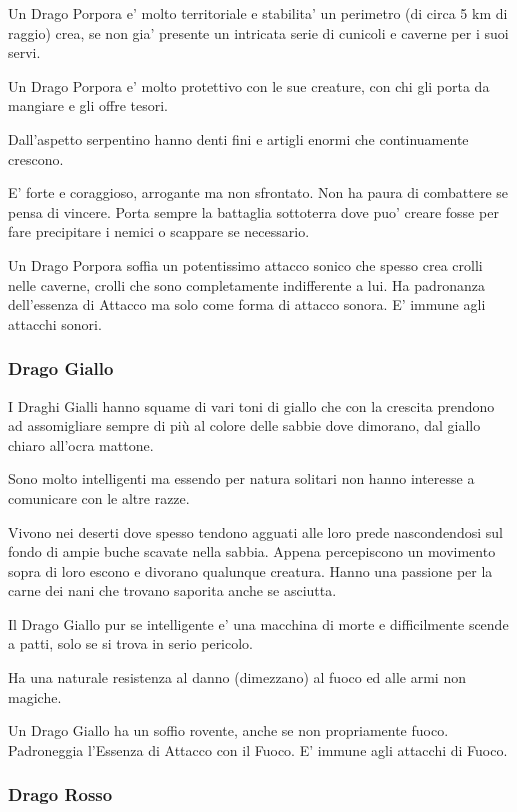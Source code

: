 \documentclass[a4paper,11pt,twoside,openany]{book}
\begin{document}
Un Drago Porpora e' molto territoriale e stabilita' un perimetro (di circa 5 km di raggio) crea, se non gia' presente un intricata serie di cunicoli e caverne per i suoi servi.

Un Drago Porpora e' molto protettivo con le sue creature, con chi gli porta da mangiare e gli offre tesori.

Dall'aspetto serpentino hanno denti fini e artigli enormi che continuamente crescono.

E' forte e coraggioso, arrogante ma non sfrontato. Non ha paura di combattere se pensa di vincere. Porta sempre la battaglia sottoterra dove puo' creare fosse per fare precipitare i nemici o scappare se necessario.

Un Drago Porpora soffia un potentissimo attacco sonico che spesso crea crolli nelle caverne, crolli che sono completamente indifferente a lui. Ha padronanza dell'essenza di Attacco ma solo come forma di attacco sonora. E' immune agli attacchi sonori.


\subsubsection{Drago Giallo}  

I Draghi Gialli hanno squame di vari toni di giallo che con la crescita prendono ad assomigliare sempre di più al colore delle sabbie dove dimorano, dal giallo chiaro all'ocra mattone.

Sono molto intelligenti ma essendo per natura solitari non hanno interesse a comunicare con le altre razze.

Vivono nei deserti dove spesso tendono agguati alle loro prede nascondendosi sul fondo di ampie buche scavate nella sabbia.
Appena percepiscono un movimento sopra di loro escono e divorano qualunque creatura.
Hanno una passione per la carne dei nani che trovano saporita anche se asciutta.

Il Drago Giallo pur se intelligente e' una macchina di morte e difficilmente scende a patti, solo se si trova in serio pericolo.

Ha una naturale resistenza al danno (dimezzano) al fuoco ed alle armi non magiche.

Un Drago Giallo ha un soffio rovente, anche se non propriamente fuoco.
Padroneggia l'Essenza di Attacco con il Fuoco. E' immune agli attacchi di Fuoco.


\subsubsection{Drago Rosso}  
\end{document}
